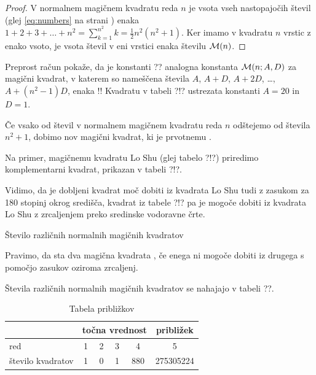 \documentclass[a4paper,12pt]{article}
\begin{document}
\begin{proof}
      V normalnem magičnem kvadratu reda $n$ je vsota vseh nastopajočih
      števil (glej \eqref{eq:numbers} na strani \pageref{eq:numbers}) enaka
      $1+2+3+\dots+n^2=\sum_{k=1}^{n^2}k=\frac{1}{2}n^2(n^2+1)$. Ker imamo
      v kvadratu $n$ vrstic z enako vsoto, je vsota števil v eni vrstici
      enaka številu $\mathcal{M}(n)$. %
\end{proof}

Preprost račun pokaže, da je konstanti ?? analogna konstanta
$\mathcal{M}(n;A,D)$ za magični kvadrat, v katerem so nameščena števila
$A$, $A+D$, $A+2D$, \dots, $A+(n^2-1)D$, enaka %
!!
Kvadratu v tabeli ?!? ustrezata konstanti $A=20$ in $D=1$.

\begin{definicija}
      Če vsako od števil v normalnem magičnem kvadratu reda $n$ odštejemo
      od števila $n^2+1$, dobimo nov magični kvadrat, ki je prvotnemu
      .
\end{definicija}

Na primer, magičnemu kvadratu Lo Shu (glej tabelo ?!?) priredimo
komplementarni kvadrat, prikazan v tabeli ?!?.
%

Vidimo, da je dobljeni kvadrat moč dobiti iz kvadrata Lo Shu tudi z zasukom za
180 stopinj okrog središča, kvadrat iz tabele ?!? pa je mogoče dobiti
iz kvadrata Lo Shu z zrcaljenjem preko sredinske vodoravne črte.

Število različnih normalnih magičnih kvadratov

\begin{definicija}
      Pravimo, da sta dva magična kvadrata , če enega ni mogoče dobiti
      iz drugega s pomočjo zasukov oziroma zrcaljenj.
\end{definicija}

Števila različnih normalnih magičnih kvadratov se nahajajo v tabeli ??.

      
      
      \begin{table}
            \centering
            \caption{Tabela približkov}
            \begin{tabular}{lccccc}\toprule
                  \hline
                   & \multicolumn{4}{c}{točna vrednost} & približek \\
                  \midrule
                  red & 1 & 2 & 3 & 4 & 5 \\
                  število kvadratov & 1 & 0 & 1 & 880 & 275305224 \\
                  \bottomrule
            \end{tabular}
            \label{table:pribl}   
      \end{table}
\end{document}
